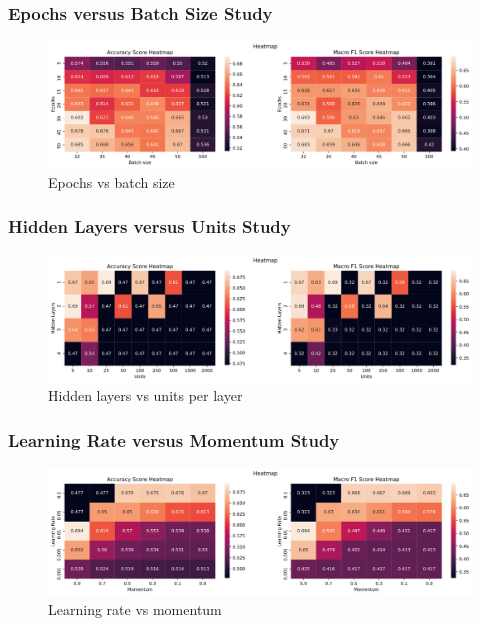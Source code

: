 \subsubsection{Epochs versus Batch Size Study}
\begin{figure}[H]
    \centering
    \includegraphics[width=1\linewidth]{pictures/ex5_heatmap_BatchEpoch.png}
    \caption{Epochs vs batch size}
    \label{fig:epochbatch_ex5}
\end{figure}


\subsubsection{Hidden Layers versus Units Study}
\begin{figure}[H]
    \centering
    \includegraphics[width=1\linewidth]{pictures/ex5_heatmap_HlUnits.png}
    \caption{Hidden layers vs units per layer}
    \label{fig:hlu_ex5}
\end{figure}

\subsubsection{Learning Rate versus Momentum Study}
\begin{figure}[H]
    \centering
    \includegraphics[width=1\linewidth]{pictures/ex5_heatmap_LrMmt.png}
    \caption{Learning rate vs momentum}
    \label{fig:lrmmt_ex5}
\end{figure}
